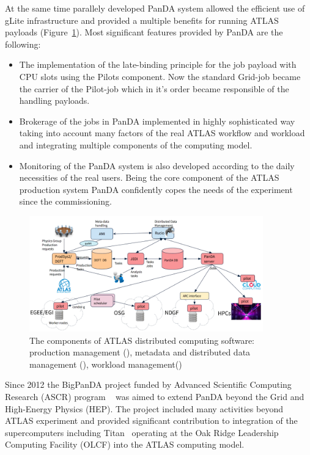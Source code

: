 \documentclass{webofc}
\begin{document}
At the same time parallely developed PanDA system  allowed the efficient use of gLite infrastructure and provided a multiple benefits for running ATLAS payloads (Figure~\ref{fig:panda-arch}).
Most significant features provided by PanDA are the following: 

\begin{itemize}
	\item The implementation of the late-binding principle for the job payload with CPU slots using the Pilots component. Now the standard Grid-job became the carrier of the Pilot-job which in it’s order became responsible of the handling  payloads. 
	\item Brokerage of the jobs in PanDA implemented in highly sophisticated way taking into account many factors of the real ATLAS workflow and workload and integrating multiple components of the computing model. 
	\item Monitoring of the PanDA system is also developed according to the daily necessities of the real users. Being the core component of the ATLAS production system PanDA confidently copes the needs of the experiment since the commissioning. 
\end{itemize}

\begin{figure}
	\centering
	\includegraphics[width=0.90\textwidth]{figures/PanDA_architecture.png}
    \caption{The components of ATLAS distributed computing software: production management (), metadata and distributed data management (), workload management()}	
	\label{fig:panda-arch}
\end{figure}

Since 2012 the BigPanDA project funded by Advanced Scientific Computing Research (ASCR) program ~\cite{DOEASCR} was aimed to extend PanDA beyond the Grid and High-Energy Physics (HEP). The project included many activities beyond ATLAS experiment and provided significant contribution to integration of the supercomputers including Titan~\cite{Titan} operating at the Oak Ridge Leadership Computing Facility (OLCF) into the ATLAS computing model. 
\end{document}
